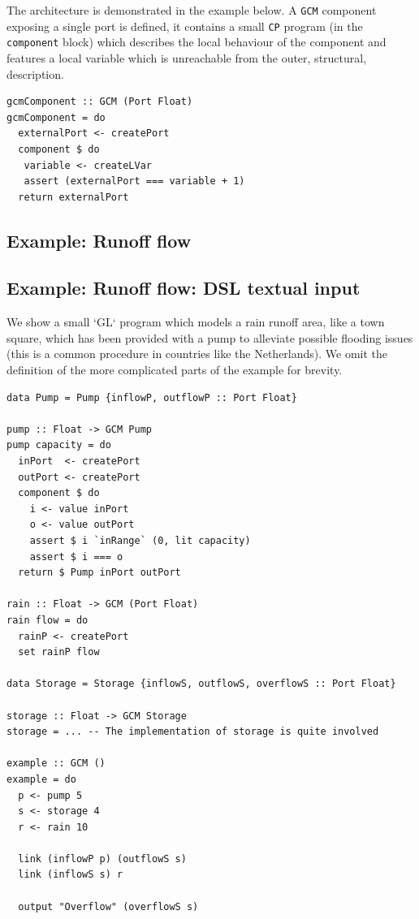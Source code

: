 \documentclass[]{article}
\begin{document}
 The architecture is demonstrated
in the example below. A \texttt{GCM} component exposing a single port is
defined, it contains a small \texttt{CP} program (in the
\texttt{component} block) which describes the local behaviour of the
component and features a local variable which is unreachable from the
outer, structural, description.

\begin{verbatim}
gcmComponent :: GCM (Port Float)
gcmComponent = do
  externalPort <- createPort
  component $ do
   variable <- createLVar
   assert (externalPort === variable + 1)
  return externalPort
\end{verbatim}

\subsection{Example: Runoff flow}\label{example-runoff-flow}


\subsection{Example: Runoff flow: DSL textual
input}\label{example-runoff-flow-dsl-textual-input}

We show a small `GL` program which models a rain runoff area,
like a town square, which has been provided with a pump to
alleviate possible flooding issues (this is a common procedure
in countries like the Netherlands). We omit the definition of the
more complicated parts of the example for brevity.
\begin{verbatim}
data Pump = Pump {inflowP, outflowP :: Port Float}

pump :: Float -> GCM Pump
pump capacity = do
  inPort  <- createPort
  outPort <- createPort
  component $ do
    i <- value inPort
    o <- value outPort
    assert $ i `inRange` (0, lit capacity)
    assert $ i === o
  return $ Pump inPort outPort

rain :: Float -> GCM (Port Float)
rain flow = do
  rainP <- createPort
  set rainP flow

data Storage = Storage {inflowS, outflowS, overflowS :: Port Float}

storage :: Float -> GCM Storage
storage = ... -- The implementation of storage is quite involved

example :: GCM ()
example = do
  p <- pump 5
  s <- storage 4
  r <- rain 10

  link (inflowP p) (outflowS s)
  link (inflowS s) r

  output "Overflow" (overflowS s)
  \end{verbatim}
\end{document}
